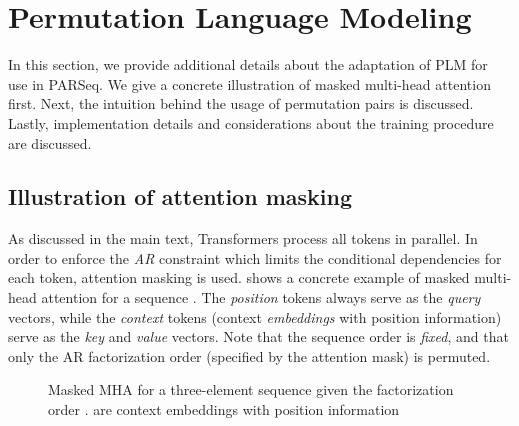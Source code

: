 \section{Permutation Language Modeling}
\label{sec:plm-appendix}

In this section, we provide additional details about the adaptation of PLM for use in PARSeq. We give a concrete illustration of masked multi-head attention first. Next, the intuition behind the usage of permutation pairs is discussed. Lastly, implementation details and considerations about the training procedure are discussed.

\subsection{Illustration of attention masking}

As discussed in the main text, Transformers process all tokens in parallel. In order to enforce the \textit{AR} constraint which limits the conditional dependencies for each token, attention masking is used.  shows a concrete example of masked multi-head attention for a sequence . The \textit{position} tokens always serve as the \textit{query} vectors, while the \textit{context} tokens (context \textit{embeddings} with position information) serve as the \textit{key} and \textit{value} vectors. Note that the sequence order is \textit{fixed}, and that only the AR factorization order (specified by the attention mask) is permuted.

\begin{figure}[htbp]
  \centering
    \hfill
     \hfill
    \hfill
     
     \caption{Masked MHA for a three-element sequence  given the factorization order .  are context embeddings with position information}
    \label{fig:attn-connectivity}
\end{figure}


